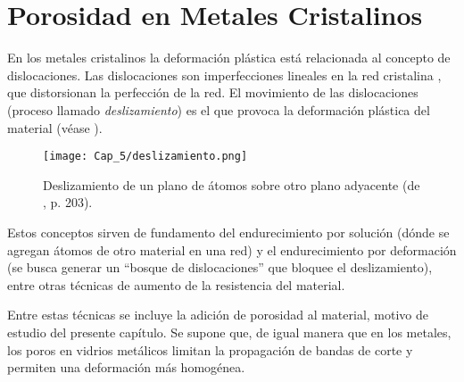 
\section{Porosidad en Metales Cristalinos}
\label{S5_2}

En los metales cristalinos la deformación plástica está relacionada al concepto de dislocaciones. Las dislocaciones son imperfecciones lineales en
la red cristalina \citep{askeland98}, que distorsionan la perfección de la red. El movimiento de las dislocaciones (proceso llamado
\textit{deslizamiento}) es el que provoca la deformación plástica del material (véase ).

\begin{figure}[h!]
\centering
  \texttt{[image: Cap\_5/deslizamiento.png]}
  \caption[Deslizamiento de un plano de átomos sobre otro plano adyacente]{Deslizamiento de un plano de átomos sobre otro plano adyacente
  (de \cite{shackelford04}, p. 203).}
  \label{C5:fg:dislocaciones}
\end{figure}



Estos conceptos sirven de fundamento del endurecimiento por solución (dónde se agregan átomos de otro material en una red) y el endurecimiento por deformación (se busca generar un ``bosque de dislocaciones'' que bloquee el deslizamiento), entre otras técnicas de aumento de la resistencia del material. 

Entre estas técnicas se incluye la adición de porosidad al material, motivo de estudio del presente capítulo. Se supone que, de igual manera que en los metales, los poros en vidrios metálicos limitan la propagación de bandas de corte y permiten una deformación más homogénea.

